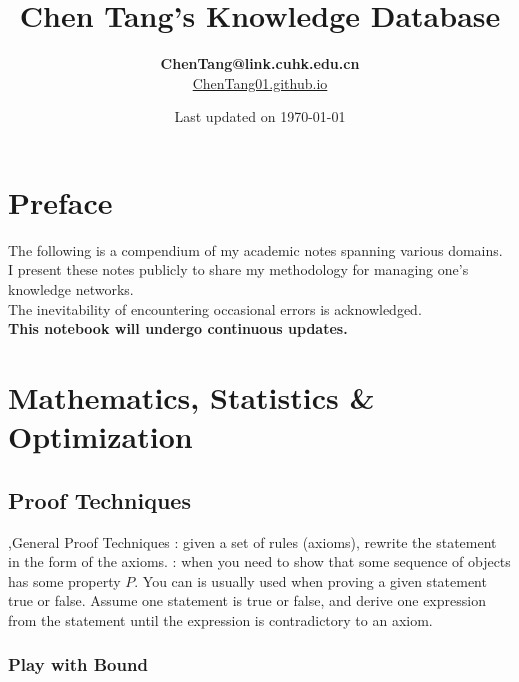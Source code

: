\documentclass[10pt]{report}
\title{\textbf{Chen Tang's \break Knowledge Database}}
\author{
    \textbf{ChenTang@link.cuhk.edu.cn} \\
    \url{ChenTang01.github.io}
}
\date{Last updated on \today}
\begin{document}
\maketitle

\chapter*{Preface}
\begin{center}
    {\Large The following is a compendium of my academic notes spanning various domains. I present these notes publicly to share my methodology for managing one's knowledge networks.\\ 
    The inevitability of encountering occasional errors is acknowledged.\\
        \bigskip
        \textbf{This notebook will undergo continuous updates.}}
\end{center}

\tableofcontents

\chapter{Mathematics, Statistics \& Optimization}

\section{Proof Techniques}

\sep{General Proof Techniques}
: given a set of rules (axioms), rewrite the statement in the form of the axioms.
: when you need to show that some sequence of objects has some property $P$. You can
 is usually used when proving a given statement true or false. Assume one statement is true or false, and derive one expression from the statement until the expression is contradictory to an axiom.

\subsection{Play with Bound}
\end{document}
